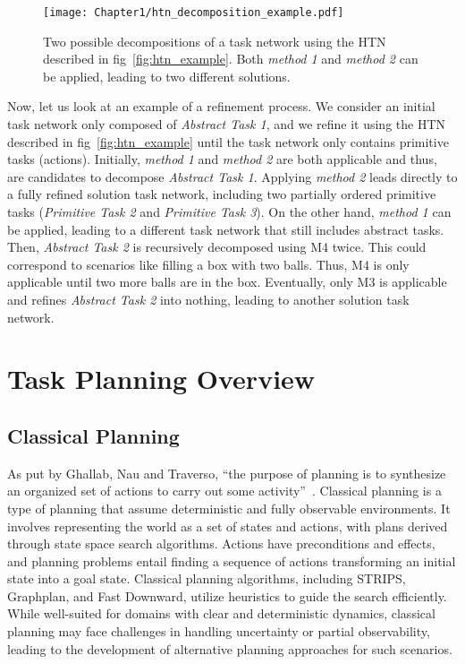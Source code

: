 \begin{figure}
    \center
    \texttt{[image: Chapter1/htn\_decomposition\_example.pdf]}
    \caption{Two possible decompositions of a task network using the HTN described in fig~\ref{fig:htn_example}. Both \emph{method 1} and \emph{method 2} can be applied, leading to two different solutions.
    }
    \label{fig:htn_decomposition_example}
\end{figure}

Now, let us look at an example of a refinement process. We consider an initial task network only composed of \emph{Abstract Task 1}, and we refine it using the HTN described in fig~\ref{fig:htn_example} until the task network only contains primitive tasks (actions). Initially, \emph{method 1} and \emph{method 2} are both applicable and thus, are candidates to decompose \emph{Abstract Task 1}. Applying \emph{method 2} leads directly to a fully refined solution task network, including two partially ordered primitive tasks (\emph{Primitive Task 2} and \emph{Primitive Task 3}). On the other hand, \emph{method 1} can be applied, leading to a different task network that still includes abstract tasks. Then, \emph{Abstract Task 2} is recursively decomposed using M4 twice. This could correspond to scenarios like filling a box with two balls. Thus, M4 is only applicable until two more balls are in the box. Eventually, only M3 is applicable and refines \emph{Abstract Task 2} into nothing, leading to another solution task network.

\section{Task Planning Overview}

\subsection{Classical Planning}

As put by Ghallab, Nau and Traverso, “the purpose of planning is to synthesize an organized set of actions to carry out some activity”~\cite{ghallab2016automated}. 
Classical planning is a type of planning that assume deterministic and fully observable environments. It involves representing the world as a set of states and actions, with plans derived through state space search algorithms. Actions have preconditions and effects, and planning problems entail finding a sequence of actions transforming an initial state into a goal state. Classical planning algorithms, including STRIPS, Graphplan, and Fast Downward, utilize heuristics to guide the search efficiently. While well-suited for domains with clear and deterministic dynamics, classical planning may face challenges in handling uncertainty or partial observability, leading to the development of alternative planning approaches for such scenarios.

